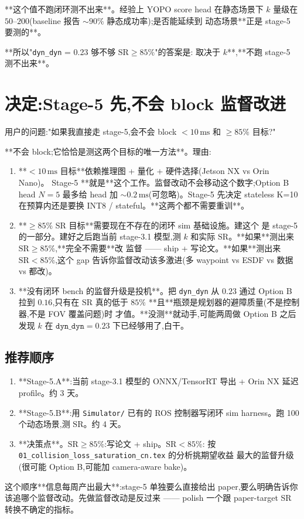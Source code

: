 \documentclass[UTF8, 11pt]{ctexart}
\newcommand{\ms}{\,\text{ms}}
\begin{document}
**这个值不跑闭环测不出来**。经验上 YOPO score head 在静态场景下 $k$
量级在 $50$--$200$(baseline 报告 $\sim$$90\%$ 静态成功率);是否能延续到
动态场景**正是 stage-5 要测的**。

**所以"\texttt{dyn\_dyn} = 0.23 够不够 $\text{SR} \geq 85\%$"的答案是:
取决于 $k$**,**不跑 stage-5 测不出来**。

\section{决定:Stage-5 先,不会 block 监督改进}

用户的问题:"如果我直接走 stage-5,会不会 block $<10\ms$ 和 $\geq 85\%$ 目标?"

**不会 block;它恰恰是测这两个目标的唯一方法**。理由:

\begin{enumerate}
  \item **$<10\ms$ 目标**依赖推理图 + 量化 + 硬件选择(Jetson NX vs Orin Nano)。
        Stage-5 **就是**这个工作。监督改动不会移动这个数字;Option B head
        $N=5$ 最多给 head 加 $\sim$$0.2\ms$(可忽略)。Stage-5 先决定
        stateless K=10 在预算内还是要换 INT8 / stateful。**这两个都不需要重训**。
  \item **$\geq 85\%$ SR 目标**需要现在不存在的闭环 sim 基础设施。建这个
        是 stage-5 的一部分。建好之后跑当前 stage-3.1 模型,测 $k$ 和实际
        $\text{SR}$。**如果**测出来 $\text{SR} \geq 85\%$,**完全不需要**改
        监督 —— ship + 写论文。**如果**测出来 $\text{SR} < 85\%$,这个 gap
        告诉你监督改动该多激进(多 waypoint vs ESDF vs 数据 vs 都改)。
  \item **没有闭环 bench 的监督升级是投机**。把 \texttt{dyn\_dyn} 从 $0.23$
        通过 Option B 拉到 $0.16$,只有在 $\text{SR}$ 真的低于 $85\%$
        **且**瓶颈是规划器的避障质量(不是控制器,不是 FOV 覆盖问题)时
        才值。**没测**就动手,可能两周做 Option B 之后发现 $k$ 在
        $\texttt{dyn\_dyn} = 0.23$ 下已经够用了,白干。
\end{enumerate}

\subsection{推荐顺序}

\begin{enumerate}
  \item **Stage-5.A**:当前 stage-3.1 模型的 ONNX/TensorRT 导出 + Orin NX
        延迟 profile。约 3 天。
  \item **Stage-5.B**:用 \texttt{Simulator/} 已有的 ROS 控制器写闭环 sim
        harness。跑 100 个动态场景,测 $\text{SR}$。约 4 天。
  \item **决策点**。$\text{SR} \geq 85\%$:写论文 + ship。$\text{SR} < 85\%$:
        按 \texttt{01\_collision\_loss\_saturation\_cn.tex} 的分析挑期望收益
        最大的监督升级(很可能 Option B,可能加 camera-aware bake)。
\end{enumerate}

这个顺序**信息每周产出最大**:stage-5 单独要么直接给出 paper,要么明确告诉你
该追哪个监督改动。先做监督改动是反过来 —— polish 一个跟 paper-target SR
转换不确定的指标。
\end{document}
